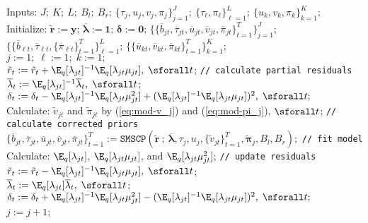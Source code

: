 \begin{algorithm}[!h]
\small
\SetAlgoLined
  Inputs: $J;\:K;\:L;\:B_l;\:B_r;\:\{\tau_j,u_j,v_j,\pi_j\}_{j=1}^J;\:\{\tau_\ell,\pi_\ell\}_{\ell=1}^L;\:\{u_k,v_k,\pi_k\}_{k=1}^K$; \\
  Initialize: $\tilde{\mathbf{r}} := \mathbf{y}$; $\overline{\pmb{\lambda}}:= \mathbf{1}$; $\pmb{\delta}:=\mathbf{0}$; $\{\{\overline{b}_{jt}, \overline{\tau}_{jt}, \overline{u}_{jt}, \overline{v}_{jt}, \overline{\pi}_{jt}\}_{t=1}^T\}_{j=1}^J$; $\{\{\overline{b}_{\ell t}, \overline{\tau}_{\ell t}, \{\overline{\pi}_{\ell t}\}_{t=1}^T\}_{\ell=1}^L$; $\{\{\overline{u}_{kt}, \overline{v}_{kt}, \overline{\pi}_{kt}\}_{t=1}^T\}_{k=1}^K$;\\
  
   {
    $j:=1;\;\ell:=1;\;k:=1;$ \\
     {
      $\tilde{r}_t := \tilde{r}_t + \E_q[\lambda_{jt}]^{-1}\E_q[\lambda_{jt} \mu_{jt}],\; \sforall t$; \texttt{// calculate partial residuals} \\
      $\overline{\lambda}_t := \E_q[\lambda_{jt}]^{-1}\overline{\lambda}_t, \; \sforall t$; \\
      $\delta_t := \delta_t - \E_q[\lambda_{jt}]^{-1}\E_q[\lambda_{jt} \mu^2_{jt}] + (\E_q[\lambda_{jt}]^{-1}\E_q[\lambda_{jt} \mu_{jt}])^2,\; \sforall t;$ \\
      Calculate: $\tilde{v}_{jt}$ and $\tilde{\pi}_{jt}$ by (\ref{eq:mod-v_j}) and (\ref{eq:mod-pi_j}), $\sforall t$; \texttt{// calculate corrected priors} \\
      $\{\overline{b}_{jt}, \overline{\tau}_{jt}, \overline{u}_{jt}, \overline{v}_{jt}, \overline{\pi}_{jt}\}_{t=1}^T := \texttt{SMSCP}(\tilde{\mathbf{r}} \:;\:\overline{\pmb{\lambda}}, \tau_j, u_j, \{\tilde{v}_{jt}\}_{t=1}^T, \tilde{\pmb{\pi}}_j, B_l,B_r);$ \texttt{// fit model}\\
      Calculate: $\E_q[\lambda_{jt}]$, $\E_q[\lambda_{jt} \mu_{jt}]$, and $\E_q[\lambda_{jt} \mu^2_{jt}]$; \texttt{// update residuals}\\
      $\tilde{r}_t := \tilde{r}_t - \E_q[\lambda_{jt}]^{-1}\E_q[\lambda_{jt} \mu_{jt}],\; \sforall t$; \\
      $\overline{\lambda}_t := \E_q[\lambda_{jt}]\overline{\lambda}_t, \; \sforall t$; \\
      $\delta_t := \delta_t + \E_q[\lambda_{jt}]^{-1}\E_q[\lambda_{jt} \mu^2_{jt}] - (\E_q[\lambda_{jt}]^{-1}\E_q[\lambda_{jt} \mu_{jt}])^2,\; \sforall t;$ \\
      $j := j + 1$; \\
}}
\end{algorithm}
